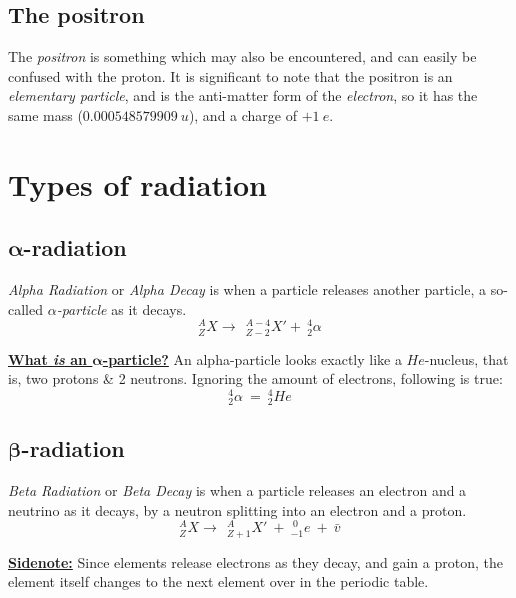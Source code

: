 \documentclass[12pt]{article}
\begin{document}
\subsection{The positron}

The \emph{positron} is something which may also be encountered, and can easily be confused with the proton. It is significant to note that the positron is an \emph{elementary particle}, and is the anti-matter form of the \emph{electron}, so it has the same mass ($0.000548579909 \ u$), and a charge of $+1 \ e$.






\section{Types of radiation}


\subsection{$\bm{\alpha}$-radiation}
\emph{Alpha Radiation} or \emph{Alpha Decay} is when a particle releases another particle, a so-called \emph{$\alpha$-particle} as it decays.
$$^{A}_{Z}X \rightarrow \ \ ^{A-4}_{Z-2}X' + \ ^{4}_{2}\alpha$$

\begin{boxA}
	\textbf{\underline{What \emph{is} an $\bm{\alpha}$-particle?}} \bigbreak
	An alpha-particle looks exactly like a $He$-nucleus, that is, two protons \& 2 neutrons. Ignoring the amount of electrons, following is true: $$^{4}_{2}\alpha \ = \ ^{4}_{2}He$$
\end{boxA}

\subsection{$\bm{\beta}$-radiation}
\emph{Beta Radiation} or \emph{Beta Decay} is when a particle releases an electron and a neutrino as it decays, by a neutron splitting into an electron and a proton. 
\bigbreak
$$^{A}_{Z}X \rightarrow \ \ ^{A}_{Z+1}X' \ + \ ^{\ 0}_{-1}e \ + \ \bar{v}$$

\begin{boxA}
	\textbf{\underline{Sidenote:}} \bigbreak
Since elements release electrons as they decay, and gain a proton, the element itself changes to the next element over in the periodic table.
\end{boxA}
\end{document}
